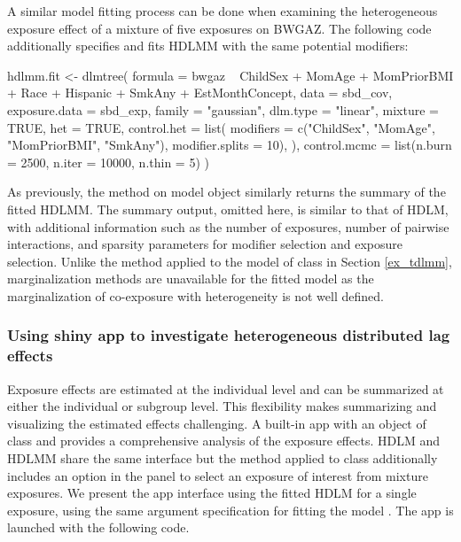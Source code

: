 A similar model fitting process can be done when examining the heterogeneous exposure effect of a mixture of five exposures on BWGAZ. The following code additionally specifies  and fits HDLMM with the same potential modifiers:

\begin{example}
hdlmm.fit <- dlmtree(
    formula = bwgaz ~ ChildSex + MomAge + MomPriorBMI +
                        Race + Hispanic + SmkAny + EstMonthConcept,
    data = sbd_cov,
    exposure.data = sbd_exp,
    family = "gaussian",
    dlm.type = "linear",
    mixture = TRUE,
    het = TRUE,
    control.het = list(
        modifiers = c("ChildSex", "MomAge", "MomPriorBMI", "SmkAny"),
        modifier.splits = 10),
    ),
    control.mcmc = list(n.burn = 2500, n.iter = 10000, n.thin = 5)
)
\end{example}
As previously, the  method on  model object similarly returns the summary of the fitted HDLMM. The summary output, omitted here, is similar to that of HDLM, with additional information such as the number of exposures, number of pairwise interactions, and sparsity parameters for modifier selection and exposure selection. Unlike the  method applied to the model of class  in Section \ref{ex_tdlmm}, marginalization methods are unavailable for the fitted model  as the marginalization of co-exposure with heterogeneity is not well defined.


\subsubsection{Using shiny app to investigate heterogeneous distributed lag effects} \label{shiny}
Exposure effects are estimated at the individual level and can be summarized at either the individual or subgroup level. This flexibility makes summarizing and visualizing the estimated effects challenging. A built-in  app with an object of class  and  provides a comprehensive analysis of the exposure effects. HDLM and HDLMM share the same  interface but the  method applied to class  additionally includes an option in the panel to select an exposure of interest from mixture exposures. We present the  app interface using the fitted HDLM for a single exposure, using the same argument specification for fitting the model . The  app is launched with the following code.

